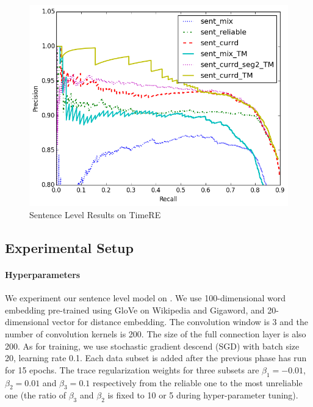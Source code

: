 \begin{figure}[t!]
\begin{center}
\includegraphics[width=0.9\linewidth]{figures/sent_time_exp_overall.png}
\caption{Sentence Level Results on TimeRE}
\label{fig: sent_luo}
\end{center}
\end{figure}

\subsection{Experimental Setup}

\paragraph{Hyperparameters}  
We experiment our sentence level model on \TimeRE. We use 100-dimensional word embedding pre-trained using GloVe \cite{pennington2014glove} on Wikipedia and Gigaword, and 20-dimensional vector for distance embedding. The convolution window is 3 and the number of convolution kernels is 200. The size of the full connection layer is also 200. As for training, we use stochastic gradient descend (SGD) with batch size 20, learning rate 0.1. Each data subset is added after the previous phase has run for 15 epochs. The trace regularization weights for three subsets are $\beta_1=-0.01$, $\beta_2=0.01$ and $\beta_3=0.1$ respectively from the reliable one to the most unreliable one (the ratio of $\beta_3$ and $\beta_2$ is fixed to 10 or 5 during hyper-parameter tuning).

